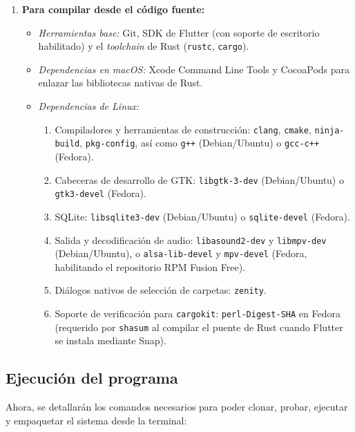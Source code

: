 \begin{itemize}
\begin{enumerate}
    \item \textbf{Para compilar desde el código fuente:}
    \begin{itemize}
        \item \textit{Herramientas base:} Git, SDK de Flutter (con soporte de escritorio habilitado) y el \textit{toolchain} de Rust (\texttt{rustc}, \texttt{cargo}).
        \item \textit{Dependencias en macOS:} Xcode Command Line Tools y CocoaPods para enlazar las bibliotecas nativas de Rust.
        \item \textit{Dependencias de Linux:}
        \begin{enumerate}
            \item[a)] Compiladores y herramientas de construcción: \texttt{clang}, \texttt{cmake}, \texttt{ninja-build}, \texttt{pkg-config}, así como \texttt{g++} (Debian/Ubuntu) o \texttt{gcc-c++} (Fedora).
            \item[b)] Cabeceras de desarrollo de GTK: \texttt{libgtk-3-dev} (Debian/Ubuntu) o \\ \texttt{gtk3-devel} (Fedora).
            \item[c)] SQLite: \texttt{libsqlite3-dev} (Debian/Ubuntu) o \texttt{sqlite-devel} (Fedora).
            \item[d)] Salida y decodificación de audio: \texttt{libasound2-dev} y \texttt{libmpv-dev} \\ (Debian/Ubuntu), o \texttt{alsa-lib-devel} y \texttt{mpv-devel} (Fedora, habilitando el repositorio RPM Fusion Free).
            \item[e)] Diálogos nativos de selección de carpetas: \texttt{zenity}.
            \item[f)] Soporte de verificación para \texttt{cargokit}: \texttt{perl-Digest-SHA} en Fedora (requerido por \texttt{shasum} al compilar el puente de Rust cuando Flutter se instala mediante Snap).
        \end{enumerate}
    \end{itemize}
\end{enumerate}

\subsection{Ejecución del programa}
Ahora, se detallarán los comandos necesarios para poder clonar, probar, ejecutar y empaquetar el sistema desde la terminal: 


\end{itemize}
